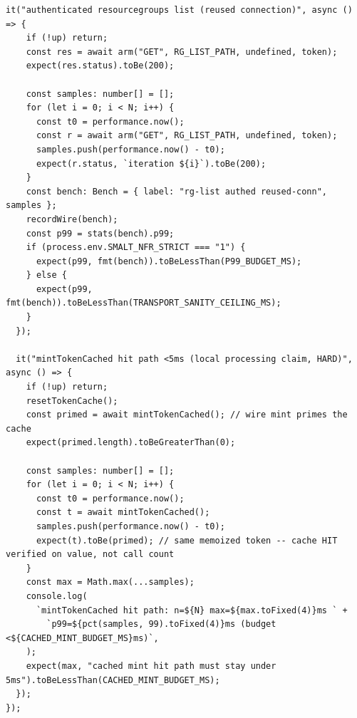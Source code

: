 \documentclass[10pt,twoside,openany]{book}
\theoremstyle{plain}
\theoremstyle{definition}
\theoremstyle{remark}
\begin{document}
\begin{lstlisting}[caption={apps/web/test/harness/nfr/perf.test.ts}]
  it("authenticated resourcegroups list (reused connection)", async () => {
    if (!up) return;
    const res = await arm("GET", RG_LIST_PATH, undefined, token);
    expect(res.status).toBe(200);

    const samples: number[] = [];
    for (let i = 0; i < N; i++) {
      const t0 = performance.now();
      const r = await arm("GET", RG_LIST_PATH, undefined, token);
      samples.push(performance.now() - t0);
      expect(r.status, `iteration ${i}`).toBe(200);
    }
    const bench: Bench = { label: "rg-list authed reused-conn", samples };
    recordWire(bench);
    const p99 = stats(bench).p99;
    if (process.env.SMALT_NFR_STRICT === "1") {
      expect(p99, fmt(bench)).toBeLessThan(P99_BUDGET_MS);
    } else {
      expect(p99, fmt(bench)).toBeLessThan(TRANSPORT_SANITY_CEILING_MS);
    }
  });

  it("mintTokenCached hit path <5ms (local processing claim, HARD)", async () => {
    if (!up) return;
    resetTokenCache();
    const primed = await mintTokenCached(); // wire mint primes the cache
    expect(primed.length).toBeGreaterThan(0);

    const samples: number[] = [];
    for (let i = 0; i < N; i++) {
      const t0 = performance.now();
      const t = await mintTokenCached();
      samples.push(performance.now() - t0);
      expect(t).toBe(primed); // same memoized token -- cache HIT verified on value, not call count
    }
    const max = Math.max(...samples);
    console.log(
      `mintTokenCached hit path: n=${N} max=${max.toFixed(4)}ms ` +
        `p99=${pct(samples, 99).toFixed(4)}ms (budget <${CACHED_MINT_BUDGET_MS}ms)`,
    );
    expect(max, "cached mint hit path must stay under 5ms").toBeLessThan(CACHED_MINT_BUDGET_MS);
  });
});

\end{lstlisting}
\end{document}
